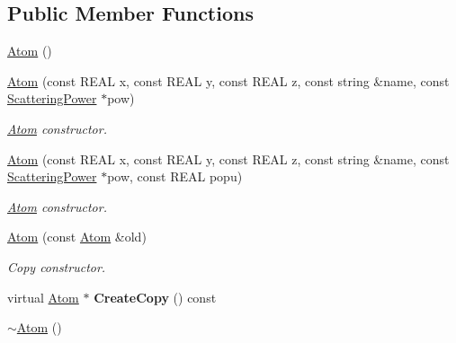 \subsection*{Public Member Functions}
\begin{DoxyCompactItemize}
\item 
\mbox{\hyperlink{class_obj_cryst_1_1_atom_afa78c541a05f1210e9913c4591752042}{Atom}} ()
\item 
\mbox{\hyperlink{class_obj_cryst_1_1_atom_a8f37e515c9e847ba20cc1033cd54e7b8}{Atom}} (const R\+E\+AL x, const R\+E\+AL y, const R\+E\+AL z, const string \&name, const \mbox{\hyperlink{class_obj_cryst_1_1_scattering_power}{Scattering\+Power}} $\ast$pow)
\begin{DoxyCompactList}\small\item\em \mbox{\hyperlink{class_obj_cryst_1_1_atom}{Atom}} constructor. \end{DoxyCompactList}\item 
\mbox{\hyperlink{class_obj_cryst_1_1_atom_a1a4253d4b5ea4d8777963a43c7817e87}{Atom}} (const R\+E\+AL x, const R\+E\+AL y, const R\+E\+AL z, const string \&name, const \mbox{\hyperlink{class_obj_cryst_1_1_scattering_power}{Scattering\+Power}} $\ast$pow, const R\+E\+AL popu)
\begin{DoxyCompactList}\small\item\em \mbox{\hyperlink{class_obj_cryst_1_1_atom}{Atom}} constructor. \end{DoxyCompactList}\item 
\mbox{\label{class_obj_cryst_1_1_atom_a4882db30ef33e70582b354db8e76a07c}} 
\mbox{\hyperlink{class_obj_cryst_1_1_atom_a4882db30ef33e70582b354db8e76a07c}{Atom}} (const \mbox{\hyperlink{class_obj_cryst_1_1_atom}{Atom}} \&old)
\begin{DoxyCompactList}\small\item\em Copy constructor. \end{DoxyCompactList}\item 
\mbox{\label{class_obj_cryst_1_1_atom_ad7542b375a56c677778bdd82bff07079}} 
virtual \mbox{\hyperlink{class_obj_cryst_1_1_atom}{Atom}} $\ast$ {\bfseries Create\+Copy} () const
\item 
\mbox{\label{class_obj_cryst_1_1_atom_a86039a28098c9b48e7f4f57636a7e55d}} 
\mbox{\hyperlink{class_obj_cryst_1_1_atom_a86039a28098c9b48e7f4f57636a7e55d}{$\sim$\+Atom}} ()

\end{DoxyCompactItemize}
